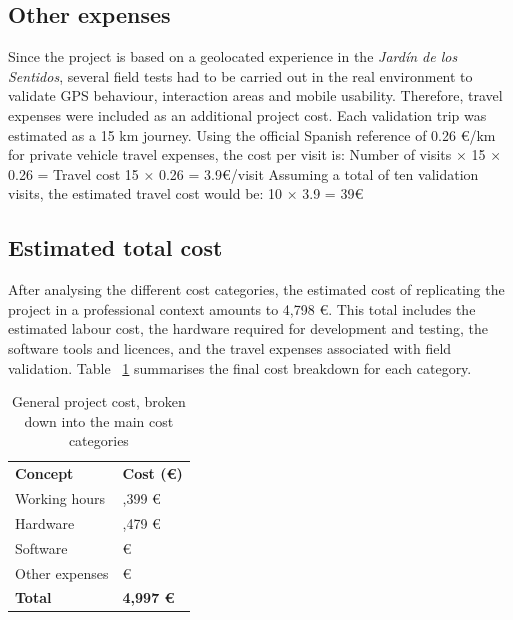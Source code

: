 \subsection{Other expenses}
Since the project is based on a geolocated experience in the \textit{Jardín de los Sentidos}, several field tests had to be carried out in the real environment to validate GPS behaviour, interaction areas and mobile usability. Therefore, travel expenses were included as an additional project cost.
Each validation trip was estimated as a 15 km journey. Using the official Spanish reference of 0.26 €/km for private vehicle travel expenses, the cost per visit is:
Number of visits × 15 × 0.26 = Travel cost      
15 × 0.26 = 3.9€/visit
Assuming a total of  ten validation visits, the estimated travel cost would be:
10 × 3.9 =  39€

\subsection{Estimated total cost}
After analysing the different cost categories, the estimated cost of replicating the project in a professional context amounts to 4,798 €. This total includes the estimated labour cost, the hardware required for development and testing, the software tools and licences, and the travel expenses associated with field validation. Table ~\ref{tab:general_costs} summarises the final cost breakdown for each category.




\vspace{1cm}
\begin{table}[htpb]
\centering
\caption{General project cost, broken down into the main cost categories}
\label{tab:general_costs}
\renewcommand{\arraystretch}{1.5}
\begin{tabular}{>{\raggedright\arraybackslash}p{} >{\raggedleft\arraybackslash}p{}}
\rowcolor[HTML]{B0C9B0} \textbf{Concept} & \textbf{Cost (€)} \\
\rowcolor[HTML]{F0F5F0} Working hours & 3,399 €\\
\rowcolor[HTML]{DFE8DF} Hardware & 1,479 €\\
\rowcolor[HTML]{F0F5F0} Software & 80 €\\
\rowcolor[HTML]{DFE8DF} Other expenses & 39 €\\
\hline
\rowcolor[HTML]{B0C9B0} \textbf{Total} & \textbf{4,997 €} \\
\end{tabular}
\end{table}

